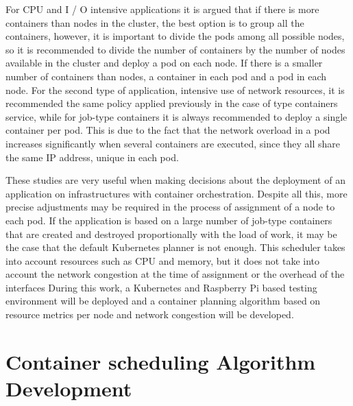 \documentclass[conference]{IEEEtran}
\begin{document}
For CPU and I / O intensive applications it is argued that if there is more containers than nodes in the cluster, the best option is to group all the 
containers, however, it is important to divide the pods among all possible nodes, so it is recommended to divide the number of containers by the number of nodes 
available in the cluster and deploy a pod on each node. If there is a smaller number of containers than nodes, a container in each pod and a pod in each node. 
For the second type of application, intensive use of network resources, it is recommended the same policy applied previously in the case of type containers
service, while for job-type containers it is always recommended to deploy a single container per pod. This is due to the fact that the network overload in a pod
increases significantly when several containers are executed, since they all share the same IP address, unique in each pod.

These studies are very useful when making decisions about the deployment of an application on infrastructures with container orchestration.
Despite all this, more precise adjustments may be required in the process of assignment of a node to each pod. If the application is based on a large number of
job-type containers that are created and destroyed proportionally with the load of work, it may be the case that the default Kubernetes planner is not
enough. This scheduler takes into account resources such as CPU and memory, but it does not take into account the network congestion at the time of assignment 
or the overhead of the interfaces During this work, a Kubernetes and Raspberry Pi based testing environment will be deployed and a container planning algorithm
based on resource metrics per node and network congestion will be developed.



\section{Container scheduling Algorithm Development}\label{sec:alg}
\end{document}
